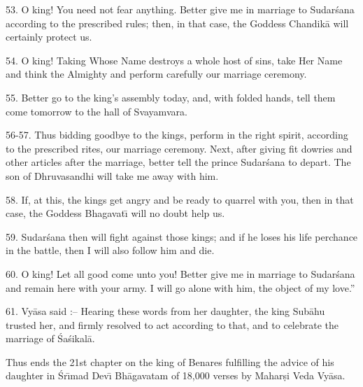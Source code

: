 53. O king! You need not fear anything. Better give me in marriage to Sudar\'sana according to the prescribed rules; then, in that case, the Goddess Chandik\=a will certainly protect us.

54. O king! Taking Whose Name destroys a whole host of sins, take Her Name and think the Almighty and perform carefully our marriage ceremony.

55. Better go to the king's assembly today, and, with folded hands, tell them come tomorrow to the hall of Svayamvara.

56-57. Thus bidding goodbye to the kings, perform in the right spirit, according to the prescribed rites, our marriage ceremony. Next, after giving fit dowries and other articles after the marriage, better tell the prince Sudar\'sana to depart. The son of Dhruvasandhi will take me away with him.

58. If, at this, the kings get angry and be ready to quarrel with you, then in that case, the Goddess Bhagavat\={\i} will no doubt help us.

59. Sudar\'sana then will fight against those kings; and if he loses his life perchance in the battle, then I will also follow him and die.

60. O king! Let all good come unto you! Better give me in marriage to Sudar\'sana and remain here with your army. I will go alone with him, the object of my love.''

61. Vy\=asa said :-- Hearing these words from her daughter, the king Sub\=ahu trusted her, and firmly resolved to act according to that, and to celebrate the marriage of \'Sa\'sikal\=a.

Thus ends the 21st chapter on the king of Benares fulfilling the advice of his daughter in \'Sr\={\i}mad Dev\={\i} Bh\=agavatam of 18,000 verses by Mahar\d{s}i Veda Vy\=asa.



